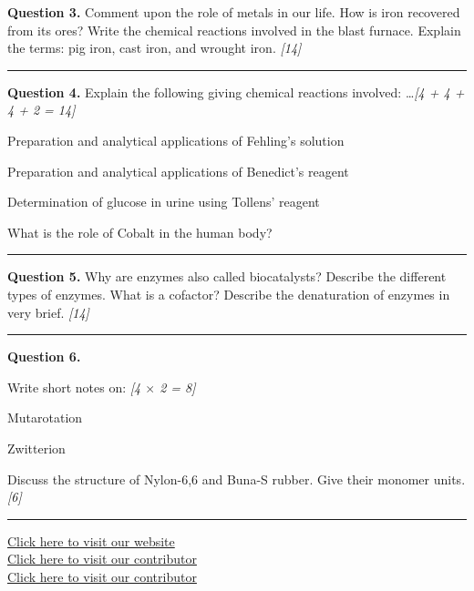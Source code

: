 \documentclass[11pt,a4paper]{article}
\newcommand{\pts}[1]{\hfill   \textit{[#1]}}
\begin{document}
\noindent   \textbf{Question 3.} Comment upon the role of metals in our life. How is iron recovered from its ores? Write the chemical reactions involved in the blast furnace. Explain the terms: pig iron, cast iron, and wrought iron. \pts{14}

\medskip\rule{\linewidth}{0.2pt}




\noindent   \textbf{Question 4.} Explain the following giving chemical reactions involved: \dots \pts{4 + 4 + 4 + 2 = 14}

\begin{parts}
  \item Preparation and analytical applications of Fehling's solution
  \item Preparation and analytical applications of Benedict's reagent
  \item Determination of glucose in urine using Tollens' reagent
  \item What is the role of Cobalt in the human body?
\end{parts}

\medskip\rule{\linewidth}{0.2pt}




\noindent   \textbf{Question 5.} Why are enzymes also called biocatalysts? Describe the different types of enzymes. What is a cofactor? Describe the denaturation of enzymes in very brief. \pts{14}

\medskip\rule{\linewidth}{0.2pt}




\noindent   \textbf{Question 6.}

\begin{parts}
  \item Write short notes on: \pts{4 $ \times$ 2 = 8}
  
\begin{parts}
    \item Mutarotation
    \item Zwitterion
  \end{parts}
  \item Discuss the structure of Nylon-6,6 and Buna-S rubber. Give their monomer units. \pts{6}
\end{parts}

\vfill
\rule{\linewidth}{0.4pt}

\begin{center}\small
  \href{https://bhu-exam.vercel.app/}{Click here to visit our website}\\[4pt]
  \href{https://me-aryan.vercel.app/}{Click here to visit our contributor}\\[4pt]
  \href{https://quashan-me.vercel.app/}{Click here to visit our contributor}
\end{center}
\end{document}
